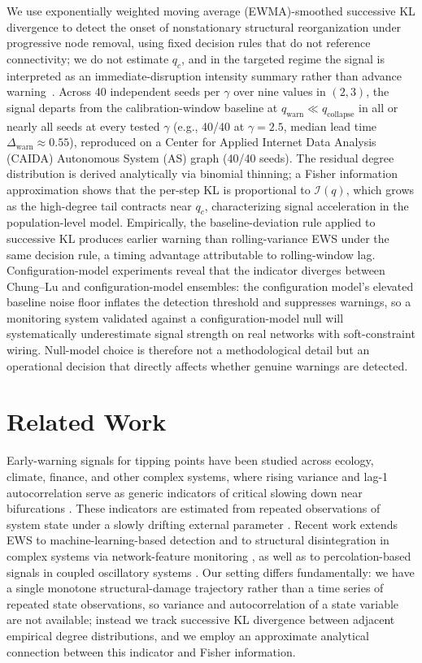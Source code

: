 \documentclass{nws}
\begin{document}
We use exponentially weighted moving average (EWMA)-smoothed successive KL divergence to detect the onset of nonstationary
structural reorganization under progressive node removal, using fixed decision rules that
do not reference connectivity; we do not estimate $q_c$, and in the targeted regime the
signal is interpreted as an immediate-disruption intensity summary rather than advance warning~\citep{cohen2001breakdown}.
Across 40 independent seeds per $\gamma$ over nine values in $(2,3)$, the signal departs
from the calibration-window baseline at $q_{\mathrm{warn}} \ll q_{\mathrm{collapse}}$ in all or nearly
all seeds at every tested $\gamma$ (e.g., 40/40 at $\gamma=2.5$, median lead time
$\Delta_{\mathrm{warn}} \approx 0.55$), reproduced on a Center for Applied Internet Data Analysis (CAIDA) Autonomous System (AS) graph (40/40 seeds).
The residual degree distribution is derived analytically via binomial thinning; a Fisher
information approximation shows that the per-step KL is proportional to $\mathcal{I}(q)$,
which grows as the high-degree tail contracts near $q_c$, characterizing signal acceleration
in the population-level model. Empirically, the baseline-deviation rule applied to successive KL produces
earlier warning than rolling-variance EWS under the same decision rule, a timing advantage
attributable to rolling-window lag.
Configuration-model experiments reveal that the indicator diverges between Chung--Lu and
configuration-model ensembles: the configuration model's elevated baseline noise floor
inflates the detection threshold and suppresses warnings, so a monitoring system
validated against a configuration-model null will systematically underestimate signal
strength on real networks with soft-constraint wiring.
Null-model choice is therefore not a methodological detail but an operational decision
that directly affects whether genuine warnings are detected.

\section{Related Work}

Early-warning signals for tipping points have been studied across ecology, climate, finance, and other complex systems, where rising variance and lag-1 autocorrelation serve as generic indicators of critical slowing down near bifurcations \citep{scheffer2012anticipating,scheffer2009earlywarning}. These indicators are estimated from repeated observations of system state under a slowly drifting external parameter \citep{vannes2007slow,dakos2012methods}. Recent work extends EWS to machine-learning-based detection \citep{bury2021deeplearning} and to structural disintegration in complex systems via network-feature monitoring \citep{grassia2021machine}, as well as to percolation-based signals in coupled oscillatory systems \citep{ehstand2023network}. Our setting differs fundamentally: we have a single monotone structural-damage trajectory rather than a time series of repeated state observations, so variance and autocorrelation of a state variable are not available; instead we track successive KL divergence between adjacent empirical degree distributions, and we employ an approximate analytical connection between this indicator and Fisher information.
\end{document}
